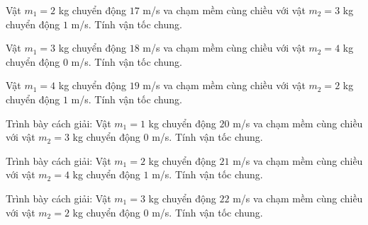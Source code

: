 \begin{ex}
Vật $m_1=2$ kg chuyển động $17$ m/s va chạm mềm cùng chiều với vật $m_2=3$ kg chuyển động $1$ m/s. Tính vận tốc chung.
\end{ex}

\begin{ex}
Vật $m_1=3$ kg chuyển động $18$ m/s va chạm mềm cùng chiều với vật $m_2=4$ kg chuyển động $0$ m/s. Tính vận tốc chung.
\end{ex}

\begin{ex}
Vật $m_1=4$ kg chuyển động $19$ m/s va chạm mềm cùng chiều với vật $m_2=2$ kg chuyển động $1$ m/s. Tính vận tốc chung.
\end{ex}

\begin{bt}
Trình bày cách giải: Vật $m_1=1$ kg chuyển động $20$ m/s va chạm mềm cùng chiều với vật $m_2=3$ kg chuyển động $0$ m/s. Tính vận tốc chung.
\end{bt}

\begin{bt}
Trình bày cách giải: Vật $m_1=2$ kg chuyển động $21$ m/s va chạm mềm cùng chiều với vật $m_2=4$ kg chuyển động $1$ m/s. Tính vận tốc chung.
\end{bt}

\begin{bt}
Trình bày cách giải: Vật $m_1=3$ kg chuyển động $22$ m/s va chạm mềm cùng chiều với vật $m_2=2$ kg chuyển động $0$ m/s. Tính vận tốc chung.
\end{bt}

